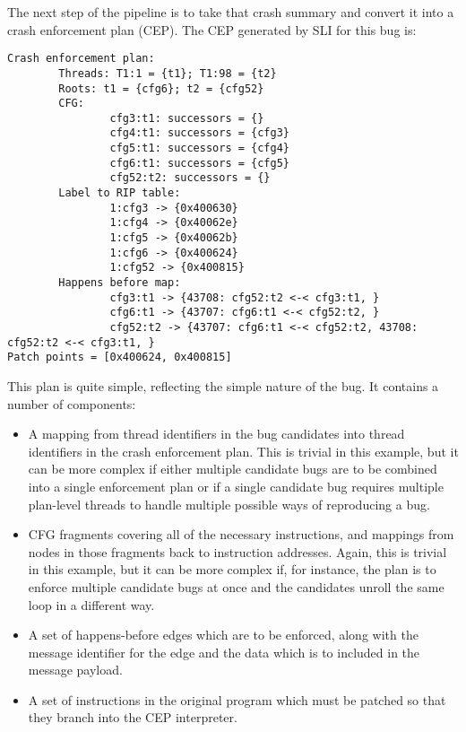 The next step of the pipeline is to take that crash summary and
convert it into a crash enforcement plan (CEP).  The CEP generated
by SLI for this bug is:

\begin{verbatim}
Crash enforcement plan:
        Threads: T1:1 = {t1}; T1:98 = {t2}
        Roots: t1 = {cfg6}; t2 = {cfg52}
        CFG:
                cfg3:t1: successors = {}
                cfg4:t1: successors = {cfg3}
                cfg5:t1: successors = {cfg4}
                cfg6:t1: successors = {cfg5}
                cfg52:t2: successors = {}
        Label to RIP table:
                1:cfg3 -> {0x400630}
                1:cfg4 -> {0x40062e}
                1:cfg5 -> {0x40062b}
                1:cfg6 -> {0x400624}
                1:cfg52 -> {0x400815}
        Happens before map:
                cfg3:t1 -> {43708: cfg52:t2 <-< cfg3:t1, }
                cfg6:t1 -> {43707: cfg6:t1 <-< cfg52:t2, }
                cfg52:t2 -> {43707: cfg6:t1 <-< cfg52:t2, 43708: cfg52:t2 <-< cfg3:t1, }
Patch points = [0x400624, 0x400815]
\end{verbatim}



This plan is quite simple, reflecting the simple nature of the bug.
It contains a number of components:

\begin{itemize}
\item A mapping from thread identifiers in the bug candidates into
  thread identifiers in the crash enforcement plan.  This is trivial
  in this example, but it can be more complex if either multiple
  candidate bugs are to be combined into a single enforcement plan or
  if a single candidate bug requires multiple plan-level threads to
  handle multiple possible ways of reproducing a bug.
\item CFG fragments covering all of the necessary instructions, and
  mappings from nodes in those fragments back to instruction
  addresses.  Again, this is trivial in this example, but it can be
  more complex if, for instance, the plan is to enforce multiple
  candidate bugs at once and the candidates unroll the same loop in a
  different way.
\item A set of happens-before edges which are to be enforced, along
  with the message identifier for the edge and the data which is to
  included in the message payload.
\item A set of instructions in the original program which must be
  patched so that they branch into the CEP interpreter.
\end{itemize}

